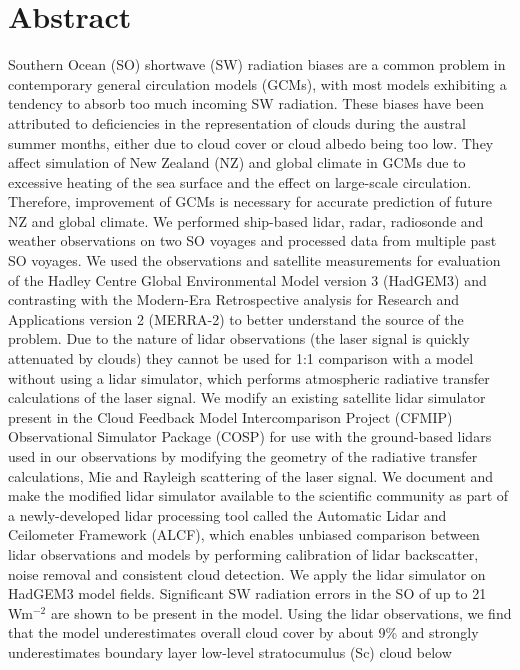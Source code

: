 \chapter*{Abstract}

\noindent
Southern Ocean (SO) shortwave (SW) radiation biases are a common
problem in contemporary general circulation models (GCMs), with most
models exhibiting a tendency to absorb too much incoming SW radiation.
These biases have been attributed to deficiencies in the representation of
clouds during the austral summer months, either due to cloud cover or cloud
albedo being too low. They affect simulation of New Zealand (NZ) and global
climate in GCMs due to excessive heating of the sea surface and the effect on
large-scale circulation. Therefore, improvement of GCMs is necessary for
accurate prediction of future NZ and global climate.
We performed ship-based lidar, radar, radiosonde and weather
observations on two SO voyages and processed data from multiple past SO
voyages. We used the observations and satellite measurements for
evaluation of the Hadley Centre Global Environmental Model version 3 (HadGEM3)
and contrasting with the Modern-Era Retrospective analysis
for Research and Applications version 2 (MERRA-2) to better
understand the source of the problem. Due to the nature of lidar
observations (the laser signal is quickly attenuated by clouds) they cannot be
used for 1:1 comparison with a model without using a lidar simulator, which
performs atmospheric radiative transfer calculations of the laser signal. We
modify an existing satellite lidar simulator present in the
Cloud Feedback Model Intercomparison Project (CFMIP)
Observational Simulator Package (COSP) for use with the ground-based lidars
used in our observations by modifying the geometry of the radiative transfer
calculations, Mie and Rayleigh scattering of the laser signal. We document
and make the modified lidar simulator available to the scientific community
as part of a newly-developed lidar processing tool called the Automatic Lidar and
Ceilometer Framework (ALCF), which enables unbiased comparison between
lidar observations and models by performing calibration of lidar backscatter,
noise removal and consistent cloud detection. We apply the lidar simulator
on HadGEM3 model fields. Significant SW radiation errors in the SO of up to 21
Wm$^{-2}$ are shown to be present in the model. Using the lidar observations,
we find that the model underestimates overall cloud cover by about 9\% and
strongly underestimates boundary layer low-level stratocumulus (Sc) cloud below
